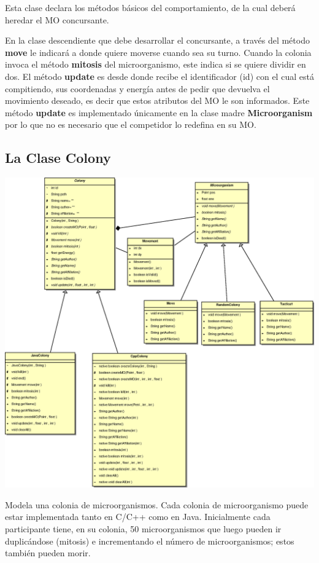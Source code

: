 \documentclass[11pt,a4paper]{article}
\begin{document}
Esta clase declara los métodos básicos del comportamiento, de la cual deberá heredar el MO concursante. 

En la clase descendiente que debe desarrollar el concursante, a través del método {\bf move} le indicará a donde quiere moverse cuando sea su turno.
Cuando la colonia invoca el método {\bf mitosis} del microorganismo, este indica si se quiere dividir en dos. El método {\bf update} es desde donde recibe el identificador (id) con el cual está compitiendo, sus coordenadas y energía antes de pedir que devuelva el movimiento deseado, es decir que estos atributos del MO le son informados. Este método {\bf update} es implementado únicamente en la clase madre {\bf Microorganism} por lo que no es necesario que el competidor lo redefina en su MO.

\subsection{La Clase Colony}
\begin{center}
\includegraphics[scale=0.6]{colony}
\end{center}

Modela una colonia de microorganismos. Cada colonia de microorganismo puede estar implementada tanto en C/C++ como en Java. Inicialmente cada participante tiene, en su colonia, 50 microorganismos que luego pueden ir duplicándose (mitosis) e incrementando el número de microorganismos; estos también pueden morir. 
\end{document}
